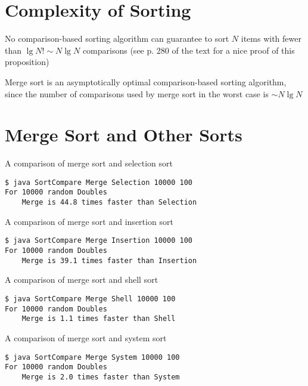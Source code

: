 \documentclass[8pt,a4paper,compress]{beamer}
\begin{document}
\section{Complexity of Sorting}
\begin{frame}[fragile]
No comparison-based sorting algorithm can guarantee to sort $N$ items with fewer than $\lg N! \sim N\lg N$ comparisons (see p. 280 of the text for a nice proof of this proposition)

\bigskip

Merge sort is an asymptotically optimal comparison-based sorting algorithm, since the number of comparisons used by merge sort in the worst case is $\sim N\lg N$
\end{frame}

\section{Merge Sort and Other Sorts}
\begin{frame}[fragile]
A comparison of merge sort and selection sort

\begin{lstlisting}[language={}]
$ java SortCompare Merge Selection 10000 100
For 10000 random Doubles
    Merge is 44.8 times faster than Selection
\end{lstlisting}

\bigskip

A comparison of merge sort and insertion sort
\begin{lstlisting}[language={}]
$ java SortCompare Merge Insertion 10000 100
For 10000 random Doubles
    Merge is 39.1 times faster than Insertion
\end{lstlisting}

\bigskip

A comparison of merge sort and shell sort

\begin{lstlisting}[language={}]
$ java SortCompare Merge Shell 10000 100
For 10000 random Doubles
    Merge is 1.1 times faster than Shell
\end{lstlisting}

\bigskip

A comparison of merge sort and system sort

\begin{lstlisting}[language={}]
$ java SortCompare Merge System 10000 100
For 10000 random Doubles
    Merge is 2.0 times faster than System
\end{lstlisting}
\end{frame}
\end{document}
